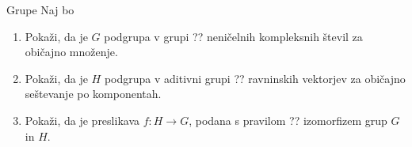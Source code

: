 \begin{frame}{Grupe}
	Naj bo
	\begin{enumerate}
		\item
			Pokaži, da je $G$ podgrupa v grupi ??
			neničelnih kompleksnih števil za običajno množenje.
		\item
			Pokaži, da je $H$ podgrupa v aditivni grupi ??
			ravninskih vektorjev za običajno seštevanje po komponentah.
		\item
			Pokaži, da je preslikava $f:H\to G$, podana s pravilom
			??
			izomorfizem grup $G$ in $H$.
	\end{enumerate}
\end{frame}
